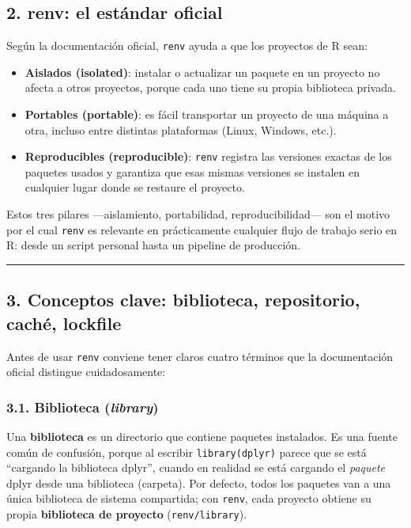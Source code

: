 \documentclass[
  man,
  floatsintext,
  longtable,
  a4paper,
  nolmodern,
  notxfonts,
  notimes,
  12pt,
  colorlinks=true,linkcolor=blue,citecolor=blue,urlcolor=blue]{apa7}
\providecommand{\tightlist}{%
  \setlength{\itemsep}{0pt}\setlength{\parskip}{0pt}}
\begin{document}
\subsection{2. renv: el estándar
oficial}\label{renv-el-estuxe1ndar-oficial}

Según la documentación oficial, \texttt{renv} ayuda a que los proyectos
de R sean:

\begin{itemize}
\tightlist
\item
  \textbf{Aislados (isolated)}: instalar o actualizar un paquete en un
  proyecto no afecta a otros proyectos, porque cada uno tiene su propia
  biblioteca privada.
\item
  \textbf{Portables (portable)}: es fácil transportar un proyecto de una
  máquina a otra, incluso entre distintas plataformas (Linux, Windows,
  etc.).
\item
  \textbf{Reproducibles (reproducible)}: \texttt{renv} registra las
  versiones exactas de los paquetes usados y garantiza que esas mismas
  versiones se instalen en cualquier lugar donde se restaure el
  proyecto.
\end{itemize}

Estos tres pilares ---aislamiento, portabilidad, reproducibilidad--- son
el motivo por el cual \texttt{renv} es relevante en prácticamente
cualquier flujo de trabajo serio en R: desde un script personal hasta un
pipeline de producción.

\begin{center}\rule{0.5\linewidth}{0.5pt}\end{center}

\subsection{3. Conceptos clave: biblioteca, repositorio, caché,
lockfile}\label{conceptos-clave-biblioteca-repositorio-cachuxe9-lockfile}

Antes de usar \texttt{renv} conviene tener claros cuatro términos que la
documentación oficial distingue cuidadosamente:

\subsubsection{\texorpdfstring{3.1. Biblioteca
(\emph{library})}{3.1. Biblioteca (library)}}\label{biblioteca-library}

Una \textbf{biblioteca} es un directorio que contiene paquetes
instalados. Es una fuente común de confusión, porque al escribir
\texttt{library(dplyr)} parece que se está ``cargando la biblioteca
dplyr'', cuando en realidad se está cargando el \emph{paquete} dplyr
desde una biblioteca (carpeta). Por defecto, todos los paquetes van a
una única biblioteca de sistema compartida; con \texttt{renv}, cada
proyecto obtiene su propia \textbf{biblioteca de proyecto}
(\texttt{renv/library}).
\end{document}
